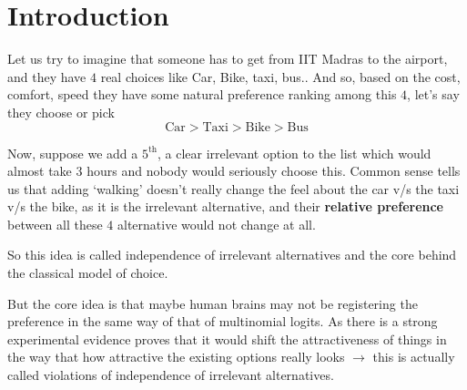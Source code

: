 

\chapter{Introduction}

 Let us try to imagine that someone has to get from IIT Madras to
the airport, and they have $4$ real choices like Car, Bike, taxi, bus..
And so, based on the cost, comfort, speed they have some natural
preference ranking among this $4$, let's say they choose or pick
\begin{equation*}
    \text{Car} > \text{Taxi} > \text{Bike} > \text{Bus}
\end{equation*}

Now, suppose we add a $5^{\text{th}}$, a clear irrelevant option to the
list which would almost take $3$ hours and nobody would seriously
choose this. Common sense tells us that adding `walking' doesn't
really change the feel about the car v/s the taxi v/s the bike, as it
is the irrelevant alternative, and their \textbf{relative preference} between all these $4$ alternative would not change at all.

So this idea is called independence of irrelevant alternatives and the
core behind the classical model of choice.

But the core idea is that maybe human brains may not be registering
the preference in the same way of that of multinomial logits. As
there is a strong experimental evidence proves that it would shift the attractiveness of things in the way that how attractive the existing options really looks $\rightarrow$ this is actually called violations of independence of irrelevant alternatives.\cite{seshadri2019}